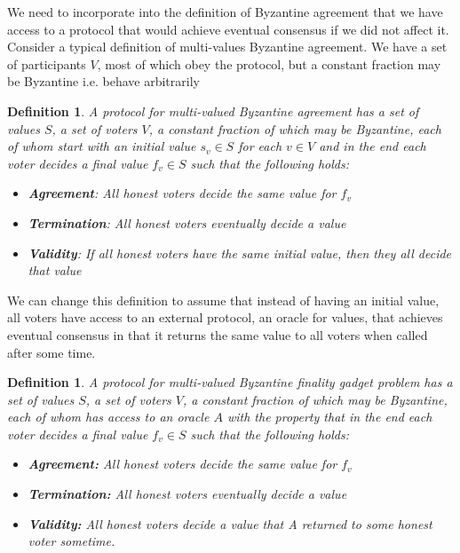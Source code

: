 \documentclass{article}
\newtheorem{definition}[theorem]{Definition}
\begin{document}
We need to incorporate into the definition of Byzantine agreement that we have access to a protocol that would achieve eventual consensus if we did not affect it. Consider a typical definition of multi-values Byzantine agreement. We have a	set of participants $V$, most of which obey the protocol, but a constant fraction may be Byzantine i.e. behave arbitrarily

\begin{definition} A protocol for multi-valued Byzantine agreement has a set of values $S$, a set of voters $V$, a constant fraction of which may be Byzantine, each of whom start with an initial value $s_v \in S$ for each $v \in V$ and in the end each voter decides a final value $f_v \in S$ such that the following holds:

\begin{itemize}
\item {\bf Agreement}: All honest voters decide the same value for $f_v$
\item {\bf Termination}: All honest voters eventually decide a value
\item {\bf Validity}: If all honest voters have the same initial value, then they all decide that value
\end{itemize}

\end{definition}

We can change this definition to assume that instead of having an initial value, all voters have access to an external protocol, an oracle for values, that achieves eventual consensus in that it returns the same value to all voters when called after some time.

\begin{definition} A protocol for multi-valued Byzantine finality gadget problem has a set of values $S$, a set of voters $V$, a constant fraction of which may be Byzantine, each of whom has access to an oracle $A$ with the property that in the end each voter decides a final value $f_v \in S$ such that the following holds:


\begin{itemize}
\item {\bf Agreement:} All honest voters decide the same value for $f_v$
\item {\bf Termination:} All honest voters eventually decide a value
\item {\bf Validity:} All honest voters decide a value that A returned to some honest voter sometime.
\end{itemize}

\end{definition}
\end{document}
